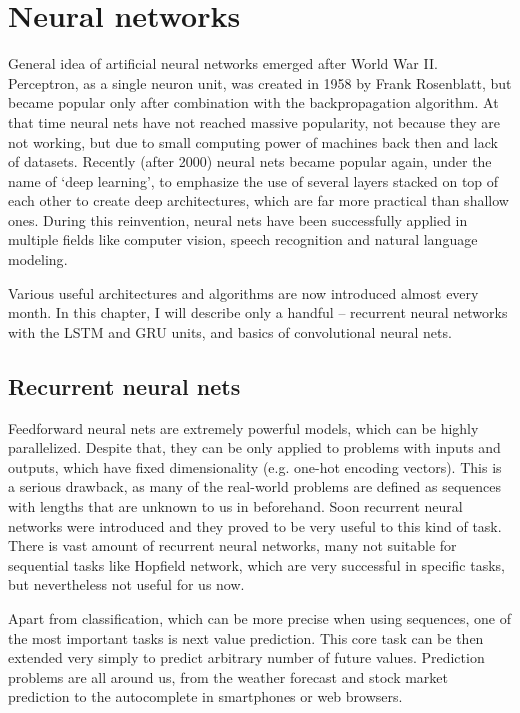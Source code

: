 \chapter{Neural networks} \label{chp:nn}
General idea of artificial neural networks emerged after World War II. Perceptron, as a single neuron unit, was created in 1958 by Frank Rosenblatt\cite{rosenblatt58a}, but became popular only after combination with the backpropagation algorithm\cite{bryson1975applied,werbos1974beyond}. At that time neural nets have not reached massive popularity, not because they are not working, but due to small computing power of machines back then and lack of datasets. Recently (after 2000) neural nets became popular again, under the name of \textquoteleft deep learning\textquoteright, to emphasize the use of several layers stacked on top of each other to create deep architectures, which are far more practical than shallow ones. During this reinvention, neural nets have been successfully applied in multiple fields like computer vision\cite{DBLP:journals/corr/HeZRS15}, speech recognition\cite{DBLP:journals/corr/abs-1303-5778} and natural language modeling\cite{DBLP:conf/interspeech/MikolovKBCK10}.

Various useful architectures and algorithms are now introduced almost every month. In this chapter, I will describe only a handful -- recurrent neural networks with the LSTM and GRU units, and basics of convolutional neural nets.

	\section{Recurrent neural nets}
Feedforward neural nets are extremely powerful models, which can be highly parallelized. Despite that, they can be only applied to problems with inputs and outputs, which have fixed dimensionality (e.g. one-hot encoding vectors). This is a serious drawback, as many of the real-world problems are defined as sequences with lengths that are unknown to us in beforehand. Soon recurrent neural networks were introduced and they proved to be very useful to this kind of task. There is vast amount of recurrent neural networks, many not suitable for sequential tasks like Hopfield network, which are very successful in specific tasks, but nevertheless not useful for us now.

Apart from classification, which can be more precise when using sequences, one of the most important tasks is next value prediction. This core task can be then extended very simply to predict arbitrary number of future values. Prediction problems are all around us, from the weather forecast and stock market prediction to the autocomplete in smartphones or web browsers.

